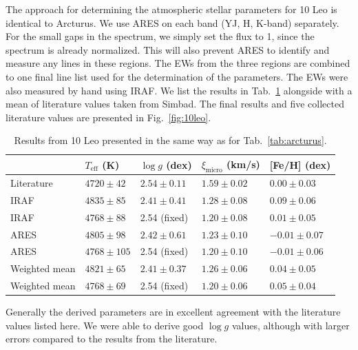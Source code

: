 \documentclass{aa}
\begin{document}
The approach for determining the atmospheric stellar parameters for 10 Leo is
identical to Arcturus. We use ARES on each band (YJ, H, K-band) separately. For
the small gaps in the spectrum, we simply set the flux to 1, since the spectrum
is already normalized. This will also prevent ARES to identify and measure any
lines in these regions. The EWs from the three regions are combined to one final
line list used for the determination of the parameters. The EWs were also
measured by hand using IRAF. We list the results in Tab.~\ref{tab:10Leo}
alongside with a mean of literature values taken from Simbad. The final results
and five collected literature values are presented in Fig.~\ref{fig:10leo}.

\begin{table}[htb!]
    \caption{Results from 10 Leo presented in the same way as for
             Tab.~\ref{tab:arcturus}.}
    \label{tab:10Leo}
    \centering
    \begin{tabular}{lllll}
      \hline\hline
                      & $T_\mathrm{eff}$ (K) &  $\log g$ (dex)  &   $\xi_\mathrm{micro}$ (km/s)   & [Fe/H] (dex)     \\
      \hline
        Literature    & $4720 \pm  42$       &  $2.54 \pm 0.11$ &    $1.59 \pm 0.02$              & $ 0.00 \pm 0.03$ \\
      \hline
        IRAF          & $4835 \pm  85$       &  $2.41 \pm 0.41$ &    $1.28 \pm 0.08$              & $ 0.09 \pm 0.06$ \\
        IRAF          & $4768 \pm  88$       &   2.54 (fixed)   &    $1.20 \pm 0.08$              & $ 0.01 \pm 0.05$ \\
      \hline
        ARES          & $4805 \pm  98$       &  $2.42 \pm 0.61$ &    $1.23 \pm 0.10$              & $-0.01 \pm 0.07$ \\
        ARES          & $4768 \pm 105$       &   2.54 (fixed)   &    $1.20 \pm 0.10$              & $-0.01 \pm 0.06$ \\
      \hline
        Weighted mean & $4821 \pm  65$       &  $2.41 \pm 0.37$ &    $1.26 \pm 0.06$              & $ 0.04 \pm 0.05$ \\
        Weighted mean & $4768 \pm  69$       &   2.54 (fixed)   &    $1.20 \pm 0.06$              & $ 0.05 \pm 0.04$ \\
      \hline
    \end{tabular}
\end{table}

Generally the derived parameters are in excellent agreement with the literature
values listed here. We were able to derive good $\log g$ values, although with
larger errors compared to the results from the literature.
\end{document}
